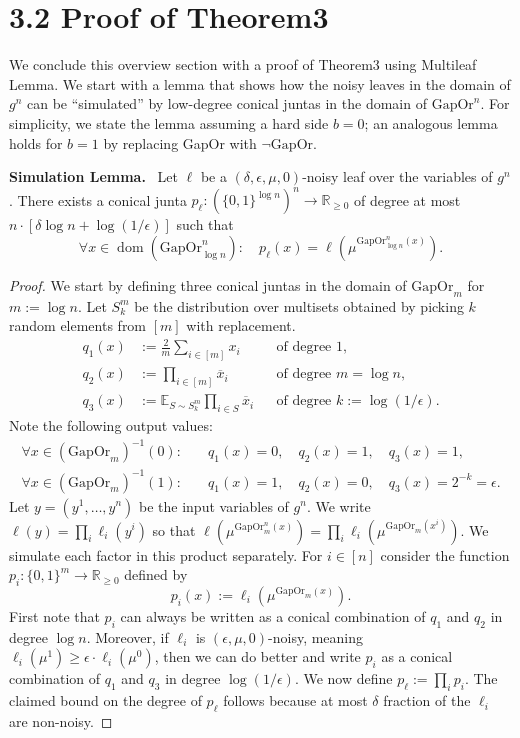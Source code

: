 \documentclass[10pt,a4paper]{article}
\newenvironment{authorclaim}[1]{\par\medskip\noindent\textbf{#1.}\ }{\par\medskip}
\begin{document}
\section*{3.2 Proof of Theorem3}
We conclude this overview section with a proof of Theorem3 using Multileaf Lemma. We start with a lemma that shows how the noisy leaves in the domain of $g^n$ can be ``simulated'' by low-degree conical juntas in the domain of $\mathrm{GapOr}^n$. For simplicity, we state the lemma assuming a hard side $b=0$; an analogous lemma holds for $b=1$ by replacing GapOr with $\neg\mathrm{GapOr}$.
\begin{authorclaim}{Simulation Lemma}
Let $\ell$ be a $(\delta,\epsilon,\mu,0)$-noisy leaf over the variables of $g^n$. There exists a conical junta $p_\ell:(\{0,1\}^{\log n})^n\to\mathbb R_{\ge0}$ of degree at most $n\cdot[\delta\log n+\log(1/\epsilon)]$ such that
\[\forall x\in\operatorname{dom}(\mathrm{GapOr}_{\log n}^n):\quad p_\ell(x)=\ell(\mu^{\mathrm{GapOr}_{\log n}^n(x)}).\]
\end{authorclaim}
\begin{proof}
We start by defining three conical juntas in the domain of $\mathrm{GapOr}_m$ for $m:=\log n$. Let $S_k^m$ be the distribution over multisets obtained by picking $k$ random elements from $[m]$ with replacement.
\begin{align*}
q_1(x)&:=\tfrac2m\sum_{i\in[m]}x_i&&\text{of degree }1,\\
q_2(x)&:=\prod_{i\in[m]}\overline x_i&&\text{of degree }m=\log n,\\
q_3(x)&:=\mathbb E_{S\sim S_k^m}\prod_{i\in S}\overline x_i&&\text{of degree }k:=\log(1/\epsilon).
\end{align*}
Note the following output values:
\begin{align*}
\forall x\in(\mathrm{GapOr}_m)^{-1}(0):&\quad q_1(x)=0,\quad q_2(x)=1,\quad q_3(x)=1,\\
\forall x\in(\mathrm{GapOr}_m)^{-1}(1):&\quad q_1(x)=1,\quad q_2(x)=0,\quad q_3(x)=2^{-k}=\epsilon.
\end{align*}
Let $y=(y^1,\ldots,y^n)$ be the input variables of $g^n$. We write $\ell(y)=\prod_i\ell_i(y^i)$ so that $\ell(\mu^{\mathrm{GapOr}_m^n(x)})=\prod_i\ell_i(\mu^{\mathrm{GapOr}_m(x^i)})$. We simulate each factor in this product separately. For $i\in[n]$ consider the function $p_i:\{0,1\}^m\to\mathbb R_{\ge0}$ defined by
\[p_i(x):=\ell_i(\mu^{\mathrm{GapOr}_m(x)}).\]
First note that $p_i$ can always be written as a conical combination of $q_1$ and $q_2$ in degree $\log n$. Moreover, if $\ell_i$ is $(\epsilon,\mu,0)$-noisy, meaning $\ell_i(\mu^1)\ge\epsilon\cdot\ell_i(\mu^0)$, then we can do better and write $p_i$ as a conical combination of $q_1$ and $q_3$ in degree $\log(1/\epsilon)$. We now define $p_\ell:=\prod_ip_i$. The claimed bound on the degree of $p_\ell$ follows because at most $\delta$ fraction of the $\ell_i$ are non-noisy.
\end{proof}
\end{document}
